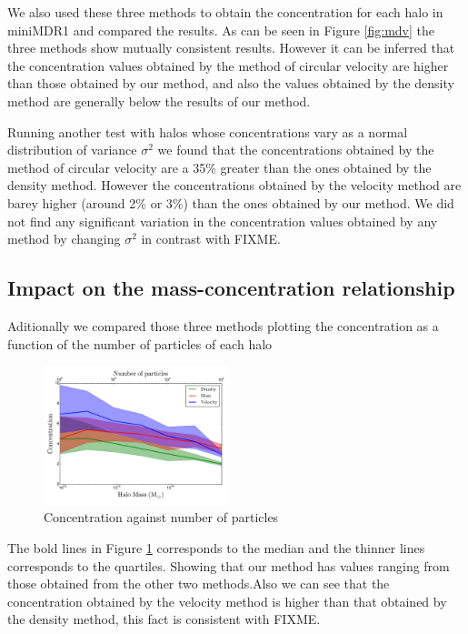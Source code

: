 \documentclass[useAMS,usenatbib]{mn2e}
\begin{document}
We also used these three methods to obtain the concentration for each halo in miniMDR1 and compared the results. As can be seen in Figure \ref{fig:mdv} the three methods show mutually consistent results. However it can be inferred that the concentration values ​​obtained by the method of circular velocity are higher than those obtained by our method, and also the values ​​obtained by the density method are generally below the results of our method.

Running another test with halos whose concentrations vary as a normal
distribution of variance ${\sigma}^2$ we found that the concentrations
obtained by the method of circular velocity are a 35\% greater than
the ones obtained by the density method. However the concentrations
obtained by the velocity method are barey higher (around 2\% or 3\%)
than the ones obtained by our method. We did not find any significant
variation in the concentration values obtained by any method by
changing ${\sigma}^2$ in contrast with FIXME.




\subsection{Impact on the mass-concentration relationship}
Aditionally we compared those three methods plotting the concentration as a function of the number of particles of each halo

\begin{figure}
\begin{center}
  \includegraphics[width=0.48\textwidth]{concentration.pdf}
\end{center}
\caption{Concentration against number of particles
    \label{fig:concentrations}}
\end{figure}

The bold lines in Figure \ref{fig:concentrations} corresponds to the median and the thinner lines corresponds to the quartiles. Showing that our method has values ​​ranging from those obtained from the other two methods.Also we can see that the concentration obtained by the velocity method is higher than that obtained by the density method, this fact is consistent with FIXME.
\end{document}
